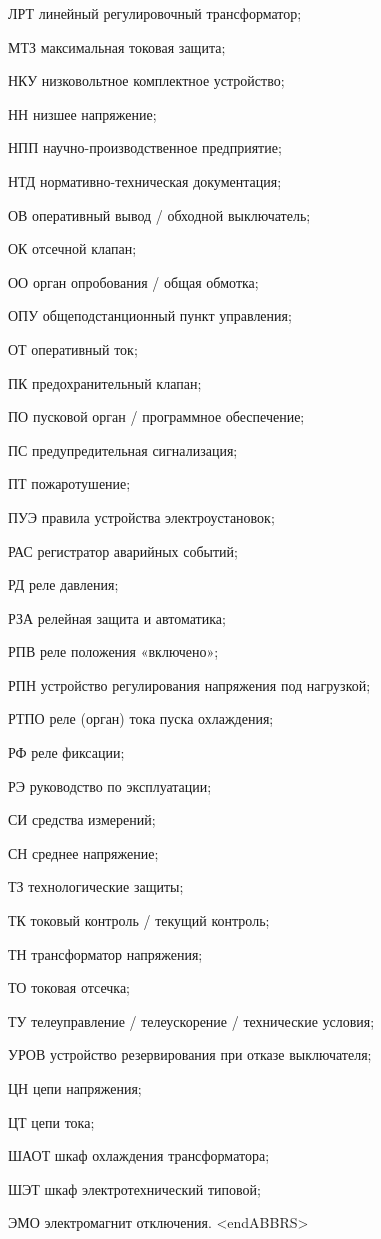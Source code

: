 \begin{list}{}
\item[ЛРТ] линейный регулировочный трансформатор;
\item[МТЗ] максимальная токовая защита;
\item[НКУ] низковольтное комплектное устройство;
\item[НН] низшее напряжение;
\item[НПП] научно-производственное предприятие;
\item[НТД] нормативно-техническая документация;
\item[ОВ] оперативный вывод / обходной выключатель;
\item[ОК] отсечной клапан;
\item[ОО] орган опробования / общая обмотка;
\item[ОПУ] общеподстанционный пункт управления;
\item[ОТ] оперативный ток;
\item[ПК] предохранительный клапан;
\item[ПО] пусковой орган / программное обеспечение;
\item[ПС] предупредительная сигнализация;
\item[ПТ] пожаротушение;
\item[ПУЭ] правила устройства электроустановок;
\item[РАС] регистратор аварийных событий;
\item[РД] реле давления;
\item[РЗА] релейная защита и автоматика;
\item[РПВ] реле положения «включено»;
\item[РПН] устройство регулирования напряжения под нагрузкой;
\item[РТПО] реле (орган) тока пуска охлаждения;
\item[РФ] реле фиксации;
\item[РЭ] руководство по эксплуатации;
\item[СИ] средства измерений;
\item[СН] среднее напряжение;
\item[ТЗ] технологические защиты;
\item[ТК] токовый контроль / текущий контроль;
\item[ТН] трансформатор напряжения;
\item[ТО] токовая отсечка;
\item[ТУ] телеуправление / телеускорение / технические условия;
\item[УРОВ] устройство резервирования при отказе выключателя;
\item[ЦН] цепи напряжения;
\item[ЦТ] цепи тока;
\item[ШАОТ] шкаф охлаждения трансформатора;
\item[ШЭТ] шкаф электротехнический типовой;
\item[ЭМО] электромагнит отключения.
{\color{white}\fontsize{0.1pt}{0.1pt}\selectfont<endABBRS>}
\end{list}
